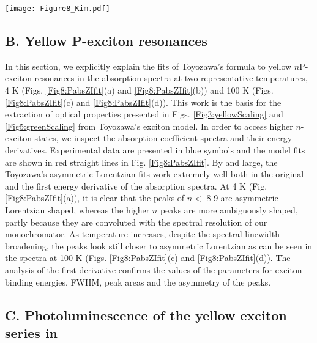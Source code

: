 \documentclass[aps,reprint,amsmath,amssymb,prb]{revtex4-1}
\begin{document}
\begin{figure*}[hb]
\texttt{[image: Figure8\_Kim.pdf]}
\caption{Yellow P-exciton resonances. The absorption coefficient spectra $\alpha$ at 4 K ((a)) and 100 K ((c)) and the first derivative of $\alpha$ in energy, $d\alpha/dE$ at 4 K (b) and 100 K (d). Red lines in all figures are the Toyozawa model fits.}
\label{Fig8:PabsZIfit}
\end{figure*}

\subsection*{B. Yellow P-exciton resonances}

In this section, we explicitly explain the fits of Toyozawa's formula to yellow $n$P-exciton resonances in the absorption spectra at two representative temperatures, 4 K (Figs. \ref{Fig8:PabsZIfit}(a) and \ref{Fig8:PabsZIfit}(b)) and 100 K (Figs. \ref{Fig8:PabsZIfit}(c) and \ref{Fig8:PabsZIfit}(d)). This work is the basis for the extraction of optical properties presented in Figs. \ref{Fig3:yellowScaling} and \ref{Fig5:greenScaling} from Toyozawa's exciton model.  In order to access higher $n$-exciton states, we inspect the absorption coefficient spectra and their energy derivatives. Experimental data are presented in blue symbols and the model fits are shown in red straight lines in Fig. \ref{Fig8:PabsZIfit}. 
By and large, the Toyozawa's asymmetric Lorentzian fits work extremely well both in the original and the first energy derivative of the absorption spectra. At 4 K (Fig. \ref{Fig8:PabsZIfit}(a)), it is clear that the peaks of $n <$ 8-9 are asymmetric Lorentzian shaped, whereas the higher $n$ peaks are more ambiguously shaped, partly because they are convoluted with the spectral resolution of our monochromator. As temperature increases, despite the spectral linewidth broadening, the peaks look still closer to asymmetric Lorentzian as can be seen in the spectra at 100 K (Figs. \ref{Fig8:PabsZIfit}(c) and \ref{Fig8:PabsZIfit}(d)). The analysis of the first derivative confirms the values of the parameters for exciton binding energies, FWHM, peak areas and the asymmetry of the peaks.\\

\subsection*{C. Photoluminescence of the yellow exciton series in }
\end{document}

